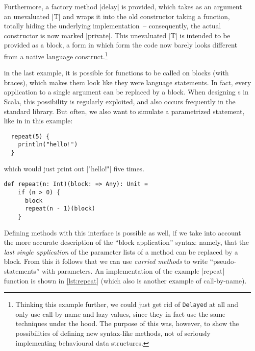 Furthermore, a factory method |delay| is provided, which takes as an argument an unevaluated |T| and
wraps it into the old constructor taking a function, totally hiding the underlying implementation~--
consequently, the actual constructor is now marked |private|. This unevaluated |T| is intended to be
provided as a block, a form in which form the code now barely looks different from a native language
construct.\footnote{Thinking this example further, we could just get rid of \lstinline|Delayed| at
  all and only use call-by-name and lazy values, since they in fact use the same techniques under
  the hood. The purpose of this was, however, to show the possibilities of defining new syntax-like
  methods, not of seriously implementing behavioural data structures.}

\label{sec:currying}
 in the last example, it is possible for functions to be called on blocks
(with braces), which makes them look like they were language statements. In fact, every application
to a single argument can be replaced by a block. When designing s in Scala, this
possibility is regularly exploited, and also occurs frequently in the standard library. But often,
we also want to simulate a parametrized statement, like in in this example:
\begin{lstlisting}
  repeat(5) {
    println("hello!")
  }
\end{lstlisting}
which would just print out |"hello!"| five times.

\begin{lstlisting}[style=floating,
  caption={Simple combinator for repeating an action \lstinline|n| times, using a curried parameter
    list. The \lstinline|block| needs to be passed by name, as it is evaluated in each iteration for
    its side effects. 
    \hfill\github{dsl-examples/blob/master/src/main/scala/dsl_examples/Imperative.scala}},
  label=lst:repeat]
  def repeat(n: Int)(block: => Any): Unit = 
    if (n > 0) {
      block
      repeat(n - 1)(block)
    }
\end{lstlisting}

Defining methods with this interface is possible as well, if we take into account the more accurate
description of the \enquote{block application} syntax: namely, that the \emph{last single
  application} of the parameter lists of a method can be replaced by a block. From this it follows
that we can use \emph{curried methods} to write \enquote{pseudo-statements} with parameters. An
implementation of the example |repeat| function is shown in \autoref{lst:repeat} (which also is
another example of call-by-name).

